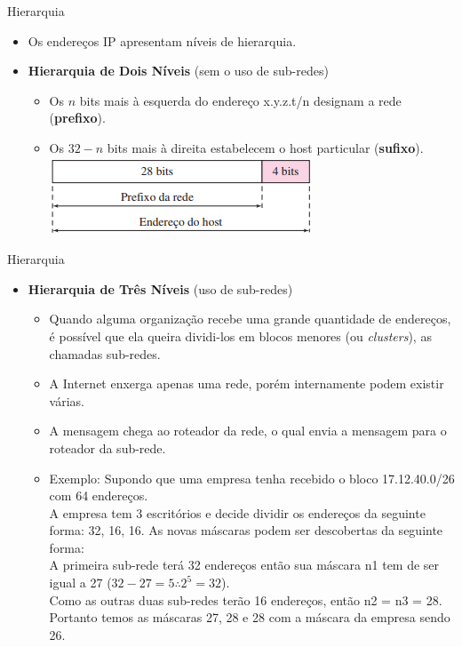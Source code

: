 \documentclass{libs/ufc_format}
\begin{document}
\begin{frame}{Hierarquia}
    \begin{itemize}
        \item Os endereços IP apresentam níveis de hierarquia.
        \item \textbf{Hierarquia de Dois Níveis} (sem o uso de sub-redes)
            \begin{itemize}
                \justifying
                \item Os $n$ bits mais à esquerda do endereço x.y.z.t/n designam a rede (\textbf{prefixo}).
                \item Os $32 - n$ bits mais à direita estabelecem o host particular (\textbf{sufixo}).\\
                \includegraphics[scale=0.7]{figuras/figura09_02}
            \end{itemize}
    \end{itemize}
\end{frame}

\begin{frame}{Hierarquia}
    \begin{itemize}
        \item \textbf{Hierarquia de Três Níveis} (uso de sub-redes)
            \begin{itemize}
                \justifying
                \item<1> Quando alguma organização recebe uma grande quantidade de endereços, é possível que ela queira dividi-los em blocos menores (ou \textit{clusters}), as chamadas sub-redes.
                \item<1> A Internet enxerga apenas uma rede, porém internamente podem existir várias.
                \item<1> A mensagem chega ao roteador da rede, o qual envia a mensagem para o roteador da sub-rede.
                \item<2-> Exemplo: Supondo que uma empresa tenha recebido o bloco 17.12.40.0/26 com 64 endereços.\\ 
                A empresa tem 3 escritórios e decide dividir os endereços da seguinte forma: 32, 16, 16. As novas máscaras podem ser descobertas da seguinte forma:\\
                A primeira sub-rede terá 32 endereços então sua máscara n1 tem de ser igual a 27 ($32 - 27 = 5 \therefore 2^{5} = 32$).\\
                Como as outras duas sub-redes terão 16 endereços, então n2 = n3 = 28.\\
                Portanto temos as máscaras 27, 28 e 28 com a máscara da empresa sendo 26.
            \end{itemize}
    \end{itemize}
\end{frame}
\end{document}
